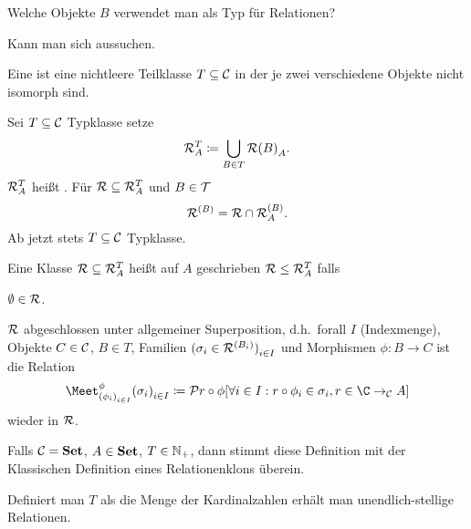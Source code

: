 \documentclass{book}
\begin{document}
\begin{question}
    Welche Objekte $B$ verwendet man als Typ für Relationen?
\end{question}

\begin{answer}
    Kann man sich aussuchen.
\end{answer}

\begin{definition}
    Eine  ist eine nichtleere Teilklasse $T\subseteq \mathcal{C}$ in der je zwei verschiedene Objekte nicht isomorph sind.
\end{definition}

\begin{definition}
    Sei $T\subseteq \mathcal{C}$ Typklasse setze
    $$
    \mathcal{R}^T_A\mathrel{\mathrel{\mathop:}\mkern-1.2mu=}\bigcup_{B\in T}{\mathcal{R}{(B)}_A}.
    $$
    $\mathcal{R}_A^T$ heißt . Für $\mathcal{R}\subseteq\mathcal{R}_A^T$ und $B\in\mathcal{T}$
    $$
    \mathcal{R}^{(B)}=\mathcal{R}\cap\mathcal{R}_A^{(B)}.
    $$
    Ab jetzt stets $T\subseteq\mathcal{C}$ Typklasse.
\end{definition}


\begin{definition}
    Eine Klasse $\mathcal{R}\subseteq\mathcal{R}_A^T$ heißt  auf $A$ geschrieben $\mathcal{R}\leq\mathcal{R}_A^T$ falls
    \begin{statements}
            \item $\emptyset\in\mathcal{R}$.
            \item $\mathcal{R}$ abgeschlossen unter allgemeiner Superposition, d.h.~forall $I$ (Indexmenge), Objekte $C\in\mathcal{C}$, $B\in T$, Familien ${(\sigma_i\in\mathcal{R}^{(B_i)})}_{i\in I}$ und Morphismen $\phi:B\to C$ ist die Relation
        $$
        \Meet_{{(\phi_i)}_{i\in I}}^{\phi}{{(\sigma_i)}_{i\in I}}\defeq\set{r\compose \phi}[\forall i\in I: r\compose\phi_i\in\sigma_i,r\in\C\to_{\cC} A]
            $$
            wieder in $\mathcal{R}$.
    \end{statements}
\end{definition}

\begin{example}
    Falls $\mathcal{C}=\mathbf{Set}$, $A\in\mathbf{Set}$, $T\in\mathbb{N}_+$, dann stimmt diese Definition mit der Klassischen Definition eines Relationenklons überein.
\end{example}

\begin{example}
    Definiert man $T$ als die Menge der Kardinalzahlen erhält man unendlich-stellige Relationen.
\end{example}
\end{document}
